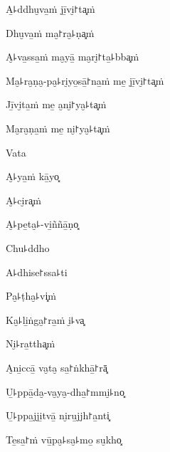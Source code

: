 A̱꜕ddhu̮va̱ṁ jī̱vi̮꜓ta͓ṁ


Dhu̮va̱ṁ ma̮꜓ra̮꜕ṇa͓ṁ


A̮꜕va̱ssa̱ṁ ma̮yā̱ ma̮ri̮꜓ta̱꜕bba͓ṁ


Ma̮꜕ra̮ṇa̮-pa̮꜕ri̮yo̱sā̱꜓na̱ṁ me̱ jī̱vi̮꜓ta͓ṁ


Jī̱vi̮ta̱ṁ me̱ a̮ni̮꜓ya̮꜕ta͓ṁ


Ma̮ra̮ṇa̱ṁ me̱ ni̮꜓ya̮꜕ta͓ṁ


Vata


A̮꜕ya̱ṁ kā̱yo͓


A̮꜕ci̮ra͓ṁ


A̮꜕pe̱ta̮꜕-vi̱ññā̱ṇo͓


Chu꜕ddho


A꜕dhise꜓ssa꜕ti


\ifaivedition
\clearpage
\fi

Pa̮꜕ṭha̮꜕vi͓ṁ


Ka̮꜕li̱ṅga̮꜓ra̱ṁ i̮꜕va͓


Ni̮꜕ra̱ttha͓ṁ


A̮ni̱ccā̱ va̮ta̮ sa̱꜓ṅkhā̱꜓rā͓


U̱꜕ppā̱da̮-va̮ya̮-dha̱꜓mmi̮꜕no͓


U̱꜕ppa̱jji̱tvā̱ ni̮ru̱jjh꜓a̱nti͓


Te̱sa̱꜓ṁ vū̱pa̮꜕sa̮꜕mo̱ su̮kho͓

